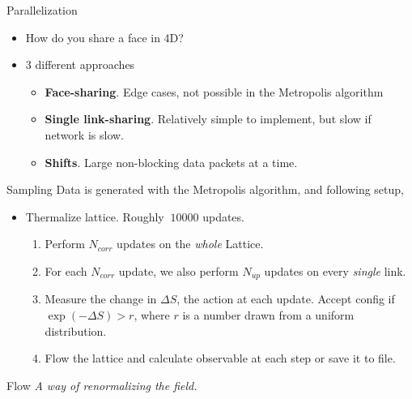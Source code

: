 \documentclass[10pt]{beamer}
\begin{document}
\begin{frame}{Parallelization}
	\begin{itemize}%
		\item How do you share a face in 4D?
		\item 3 different approaches
		\begin{itemize}%
			\item \textbf{Face-sharing}. Edge cases, not possible in the Metropolis algorithm
			\item \textbf{Single link-sharing}. Relatively simple to implement, but slow if network is slow.
			\item \textbf{Shifts}. Large non-blocking data packets at a time.
		\end{itemize}
	\end{itemize}
\end{frame}

\begin{frame}{Sampling}
	Data is generated with the Metropolis algorithm, and following setup,
	\begin{itemize}
		\item Thermalize lattice. Roughly $~10000$ updates.
		\begin{enumerate}
			\item Perform $N_{corr}$ updates on the \textit{whole} Lattice.
			\item For each $N_{corr}$ update, we also perform $N_{up}$ updates on every \textit{single} link.
			\item Measure the change in $\Delta S$, the action at each update. Accept config if $\exp(-\Delta S) > r$, where $r$ is a number drawn from a uniform distribution.
			\item Flow the lattice and calculate observable at each step or save it to file.
		\end{enumerate}
	\end{itemize}
\end{frame}

\begin{frame}{Flow}
	\textit{A way of renormalizing the field.}
\end{frame}
\end{document}
